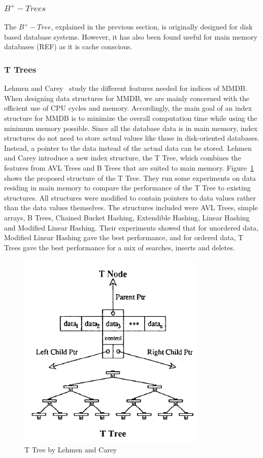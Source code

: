 \documentclass[12pt,a4paper]{article}
\begin{document}
\subsubsection*{$B^{+}-Trees$}
The $B^{+}-Tree$, explained in the previous section, is originally designed for disk based database systems. However, it has also been found useful for main memory databases (REF) as it is cache conscious.


\subsubsection*{T Trees}
Lehmen and Carey~\cite{lehman1986study} study the different features needed for indices of MMDB. When designing data structures for MMDB, we are mainly concerned with the efficient use of CPU cycles and memory. Accordingly, the main goal of an index structure for MMDB is to minimize the overall computation time while using the minimum memory possible. Since all the database data is in main memory, index structures do not need to store actual values like those in disk-oriented databases. Instead, a pointer to the data instead of the actual data can be stored. Lehmen and Carey introduce a new index structure, the T Tree, which combines the features from AVL Trees and B Trees that are suited to main memory. Figure~\ref{fig:ttree} shows the proposed structure of the T Tree. They run some experiments on data residing in main memory to compare the performance of the T Tree to existing structures. All structures were modified to contain pointers to data values rather than the data values themselves. The structures included were  AVL Trees, simple arrays, B Trees, Chained Bucket Hashing, Extendible Hashing, Linear Hashing and Modified Linear Hashing. Their experiments showed that for unordered data, Modified Linear Hashing gave the best performance, and for ordered data, T Trees gave the best performance for a mix of searches, inserts and deletes.


\begin{figure}[!t]
\centering
\includegraphics[width=9cm]{figs/Ttree.png}
\caption{T Tree by Lehmen and Carey~\cite{lehman1986study}}
\label{fig:ttree}
\end{figure}
\end{document}
